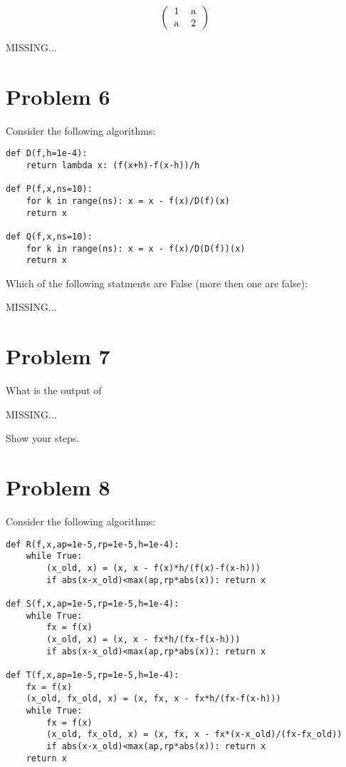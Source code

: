 \documentclass[12pt]{article}
\begin{document}
\[
\left(
\begin{tabular}{cc}
1 & a \\
a & 2 
\end{tabular}
\right)
\]

MISSING...

\section{Problem 6}

\noindent Consider the following algorithms:

\begin{verbatim}
def D(f,h=1e-4):
    return lambda x: (f(x+h)-f(x-h))/h

def P(f,x,ns=10):
    for k in range(ns): x = x - f(x)/D(f)(x)
    return x

def Q(f,x,ns=10):
    for k in range(ns): x = x - f(x)/D(D(f))(x)
    return x
\end{verbatim}

\noindent Which of the following statments are False (more then one are false):

MISSING...

\section{Problem 7}

\noindent What is the output of

MISSING...

Show your steps.

\section{Problem 8}

\noindent Consider the following algorithms:

\begin{verbatim}
def R(f,x,ap=1e-5,rp=1e-5,h=1e-4):
    while True:
        (x_old, x) = (x, x - f(x)*h/(f(x)-f(x-h)))
        if abs(x-x_old)<max(ap,rp*abs(x)): return x

def S(f,x,ap=1e-5,rp=1e-5,h=1e-4):
    while True:
        fx = f(x)
        (x_old, x) = (x, x - fx*h/(fx-f(x-h)))
        if abs(x-x_old)<max(ap,rp*abs(x)): return x

def T(f,x,ap=1e-5,rp=1e-5,h=1e-4):
    fx = f(x)
    (x_old, fx_old, x) = (x, fx, x - fx*h/(fx-f(x-h)))
    while True:
        fx = f(x)
        (x_old, fx_old, x) = (x, fx, x - fx*(x-x_old)/(fx-fx_old))
        if abs(x-x_old)<max(ap,rp*abs(x)): return x
    return x
\end{verbatim}
\end{document}
